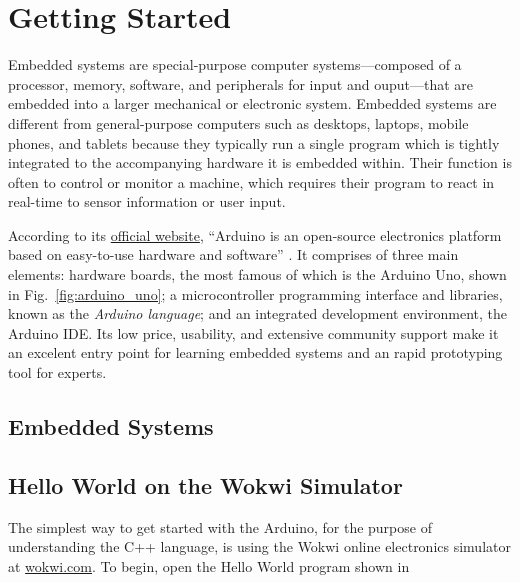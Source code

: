 \chapter{Getting Started}
Embedded systems \parencite{leveson_embedded_2003} are special-purpose computer systems---composed of a processor, memory, software, and peripherals for input and ouput---that are embedded into a larger mechanical or electronic system.
Embedded systems are different from general-purpose computers such as desktops, laptops, mobile phones, and tablets because they typically run a single program which is tightly integrated to the accompanying hardware it is embedded within.
Their function is often to control or monitor a machine, which requires their program to react in real-time to sensor information or user input.

According to its \href{https://www.arduino.cc/en/Guide/Introduction}{official website}, 
``Arduino is an open-source electronics platform based on easy-to-use hardware and software'' \parencite{arduino_what_2018}.
It comprises of three main elements: 
hardware boards, the most famous of which is the Arduino Uno, shown in Fig.~\ref{fig:arduino_uno};
a microcontroller programming interface and libraries, known as the \emph{Arduino language};
and an integrated development environment, the Arduino IDE.
Its low price, usability, and extensive community support make it an excelent entry point for learning embedded systems and an rapid prototyping tool for experts.

\section{Embedded Systems}
\section{Hello World on the Wokwi Simulator}
The simplest way to get started with the Arduino, for the purpose of understanding the C++ language, is using the Wokwi online electronics simulator at \href{https://wokwi.com}{wokwi.com}.
To begin, open the Hello World program shown in 

